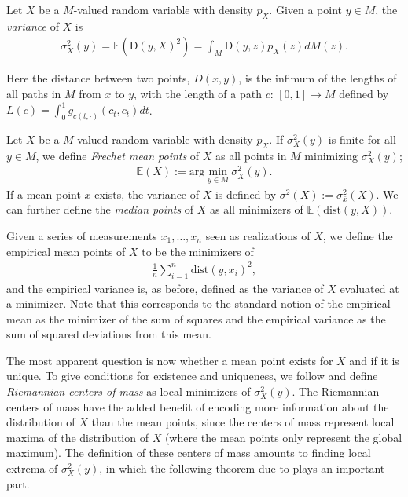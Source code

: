 \begin{definition}
Let $X$ be a $M$-valued random variable with density $p_X$. Given a point $y \in M$, the \textit{variance} of $X$ is
\begin{align*}
\sigma^2_X (y) = \mathbb{E} ( \text{D} (y,X)^2 ) = \int_M \text{D} (y,z) p_X(z) dM(z).
\end{align*}
\end{definition}

Here the distance between two points, $D(x,y)$, is the infimum of the lengths of all paths in $M$ from $x$ to $y$, with the length of a path $c: \, [0,1] \rightarrow M$ defined by $L(c) = \int_0^1 g_{c(t, \cdot)} (c_t, c_t) dt$.

\begin{definition}
Let $X$ be a $M$-valued random variable with density $p_X$. If $\sigma^2_X (y)$ is finite for all $y \in M$, we define \textit{Frechet mean points} of $X$ as all points in $M$ minimizing $\sigma^2_X (y)$;
\begin{align*}
\mathbb{E} (X) := \text{arg} \min_{y \in M} \sigma^2_X (y).
\end{align*}
If a mean point $\bar{x}$ exists, the variance of $X$ is defined by $\sigma^2 (X) := \sigma^2_{\bar{x}} (X)$. We can further define the \textit{median points} of $X$ as all minimizers of $\mathbb{E} ( \text{dist} (y,X))$.
\end{definition}

\begin{note}
Given a series of measurements $x_1, \ldots , x_n$ seen as realizations of $X$, we define the empirical mean points of $X$ to be the minimizers of 
\begin{align*}
\frac{1}{n} \sum_{i = 1}^n \text{dist}(y, x_i)^2,
\end{align*}
and the empirical variance is, as before, defined as the variance of $X$ evaluated at a minimizer. Note that this corresponds to the standard notion of the empirical mean as the minimizer of the sum of squares and the empirical variance as the sum of squared deviations from this mean.
\end{note}

The most apparent question is now whether a mean point exists for $X$ and if it is unique. To give conditions for existence and uniqueness, we follow \cite{karcher1977center} and define \textit{Riemannian centers of mass} as local minimizers of $\sigma_X^2 (y)$. The Riemannian centers of mass have the added benefit of encoding more information about the distribution of $X$ than the mean points, since the centers of mass represent local maxima of the distribution of $X$ (where the mean points only represent the global maximum). The definition of these centers of mass amounts to finding local extrema of $\sigma_X^2 (y)$, in which the following theorem due to \cite{pennec2006intrinsic} plays an important part.

